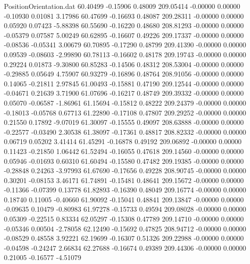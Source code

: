\begin{filecontents}{PositionOrientation.dat}
  60.40499   -0.15906    0.48009   209.05414   -0.00000    0.00000   -0.10930    0.01081    3.17986
  60.47699   -0.16693    0.48087   209.28311   -0.00000    0.00000    0.05920    0.07423   -5.88398
  60.55690   -0.16220    0.48680   208.81293   -0.00000    0.00000   -0.05379    0.07587    5.00249
  60.62895   -0.16607    0.49226   209.17337   -0.00000    0.00000   -0.08536   -0.05341    3.00679
  60.70895   -0.17290    0.48799   209.41390   -0.00000    0.00000    0.09539   -0.08603   -2.99890
  60.78113   -0.16602    0.48178   209.19743   -0.00000    0.00000    0.29224    0.01873   -9.30800
  60.85283   -0.14506    0.48312   208.53004   -0.00000    0.00000   -0.29885    0.05649    4.75907
  60.93279   -0.16896    0.48764   208.91056   -0.00000    0.00000    0.14065   -0.21811    2.97845
  61.00493   -0.15881    0.47190   209.12544   -0.00000    0.00000   -0.04671    0.21639    3.71900
  61.07696   -0.16217    0.48749   209.39332   -0.00000    0.00000    0.05070   -0.06587   -1.86961
  61.15694   -0.15812    0.48222   209.24379   -0.00000    0.00000   -0.18013   -0.05768    0.67713
  61.22890   -0.17108    0.47807   209.29252   -0.00000    0.00000    0.21550    0.17892   -9.07019
  61.30097   -0.15555    0.49097   208.63888   -0.00000    0.00000   -0.22577   -0.03490    2.30538
  61.38097   -0.17361    0.48817   208.82332   -0.00000    0.00000    0.06719    0.05202    3.41414
  61.45291   -0.16878    0.49192   209.06892   -0.00000    0.00000    0.11423   -0.21850    1.06442
  61.52494   -0.16055    0.47618   209.14560   -0.00000    0.00000    0.05946   -0.01693    0.60310
  61.60494   -0.15580    0.47482   209.19385   -0.00000    0.00000   -0.28848    0.24263   -3.97993
  61.67690   -0.17656    0.49228   208.90745   -0.00000    0.00000    0.30201   -0.08153    3.46171
  61.74891   -0.15481    0.48641   209.15672   -0.00000    0.00000   -0.11366   -0.07399    0.13778
  61.82893   -0.16390    0.48049   209.16774   -0.00000    0.00000    0.18740    0.11005   -0.40660
  61.90092   -0.15041    0.48841   209.13847   -0.00000    0.00000   -0.09635    0.10479   -0.80983
  61.97278   -0.15733    0.49594   209.08028   -0.00000    0.00000    0.05309   -0.22515    0.83334
  62.05297   -0.15308    0.47789   209.14710   -0.00000    0.00000   -0.05346    0.00504   -2.78058
  62.12490   -0.15692    0.47825   208.94712   -0.00000    0.00000   -0.08529    0.48558    3.92221
  62.19699   -0.16307    0.51326   209.22988   -0.00000    0.00000   -0.04598   -0.24247    2.66834
  62.27688   -0.16674    0.49389   209.44306   -0.00000    0.00000    0.21005   -0.16577   -4.51079

\end{filecontents}
